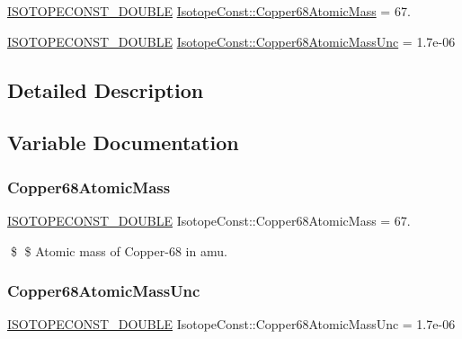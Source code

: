 \begin{DoxyCompactItemize}
\item 
\mbox{\hyperlink{group___isotope_const-_macros_ga8f45a7272ce02c0b4c65c44636ed719a}{I\+S\+O\+T\+O\+P\+E\+C\+O\+N\+S\+T\+\_\+\+D\+O\+U\+B\+LE}} \mbox{\hyperlink{group___isotope_const-_copper-_cu68_ga467a9941c116632d04dc128ee4afc074}{Isotope\+Const\+::\+Copper68\+Atomic\+Mass}} = 67.
\item 
\mbox{\hyperlink{group___isotope_const-_macros_ga8f45a7272ce02c0b4c65c44636ed719a}{I\+S\+O\+T\+O\+P\+E\+C\+O\+N\+S\+T\+\_\+\+D\+O\+U\+B\+LE}} \mbox{\hyperlink{group___isotope_const-_copper-_cu68_ga7710ce124289ce8a513a55af203da29b}{Isotope\+Const\+::\+Copper68\+Atomic\+Mass\+Unc}} = 1.\+7e-\/06
\end{DoxyCompactItemize}


\subsection{Detailed Description}


\subsection{Variable Documentation}
\mbox{\label{group___isotope_const-_copper-_cu68_ga467a9941c116632d04dc128ee4afc074}} 
\subsubsection{\texorpdfstring{Copper68\+Atomic\+Mass}{Copper68AtomicMass}}
{\footnotesize\ttfamily \mbox{\hyperlink{group___isotope_const-_macros_ga8f45a7272ce02c0b4c65c44636ed719a}{I\+S\+O\+T\+O\+P\+E\+C\+O\+N\+S\+T\+\_\+\+D\+O\+U\+B\+LE}} Isotope\+Const\+::\+Copper68\+Atomic\+Mass = 67.}

\$ \$ Atomic mass of Copper-\/68 in amu. \mbox{\label{group___isotope_const-_copper-_cu68_ga7710ce124289ce8a513a55af203da29b}} 
\subsubsection{\texorpdfstring{Copper68\+Atomic\+Mass\+Unc}{Copper68AtomicMassUnc}}
{\footnotesize\ttfamily \mbox{\hyperlink{group___isotope_const-_macros_ga8f45a7272ce02c0b4c65c44636ed719a}{I\+S\+O\+T\+O\+P\+E\+C\+O\+N\+S\+T\+\_\+\+D\+O\+U\+B\+LE}} Isotope\+Const\+::\+Copper68\+Atomic\+Mass\+Unc = 1.\+7e-\/06}

